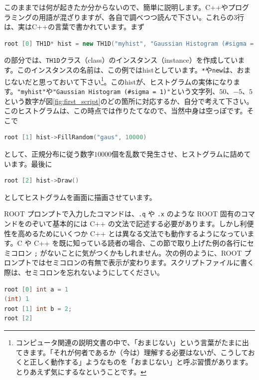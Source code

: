 このままでは何が起きたか分からないので、簡単に説明します。C++やプログラミングの用語が混ざりますが、各自で調べつつ読んで下さい。これらの3行は、実はC++の言葉で書かれています。まず
\begin{lstlisting}[language=c++]
root [0] TH1D* hist = new TH1D("myhist", "Gaussian Histogram (#sigma = 1)", 50, -5, 5)
\end{lstlisting}
の部分では、\texttt{TH1D}クラス（class）のインスタンス（instance）を作成しています。このインスタンスの名前は、この例ではhistとしています。\texttt{*}や\texttt{new}は、おまじないだと思っておいて下さい\footnote{コンピュータ関連の説明文書の中で、「おまじない」という言葉がたまに出てきます。「それが何者であるか（今は）理解する必要はないが、こうしておくと正しく動作する」ようなものを「おまじない」と呼ぶ習慣があります。とりあえず気にするなということです。}。このhistが、ヒストグラムの実体になります。\texttt{"myhist"}や\texttt{"Gaussian Histogram (\#sigma = 1)"}という文字列、$50$、$-5$、$5$という数字が図\ref{fig:first_script}のどの箇所に対応するか、自分で考えて下さい。このヒストグラムは、この時点では作りたてなので、当然中身は空っぽです。そこで
\begin{lstlisting}[language=c++]
root [1] hist->FillRandom("gaus", 10000)
\end{lstlisting}
として、正規分布に従う数字$10000$個を乱数で発生させ、ヒストグラムに詰めています。最後に
\begin{lstlisting}[language=c++]
root [2] hist->Draw()
\end{lstlisting}
としてヒストグラムを画面に描画させています。

ROOT プロンプトで入力したコマンドは、\texttt{.q} や \texttt{.x} のような ROOT 固有のコマンドをのぞいて基本的には C++ の文法で記述する必要があります。しかし利便性を高めるためにいくつか C++ とは異なる文法でも動作するようになっています。C や C++ を既に知っている読者の場合、この節で取り上げた例の各行にセミコロン \texttt{;} がないことに気がつくかもしれません。次の例のように、ROOT プロンプトではセミコロンの有無で表示が変わります。スクリプトファイルに書く際は、セミコロンを忘れないようにしてください。

\begin{lstlisting}[language=c++]
root [0] int a = 1
(int) 1
root [1] int b = 2;
root [2] 
\end{lstlisting}

